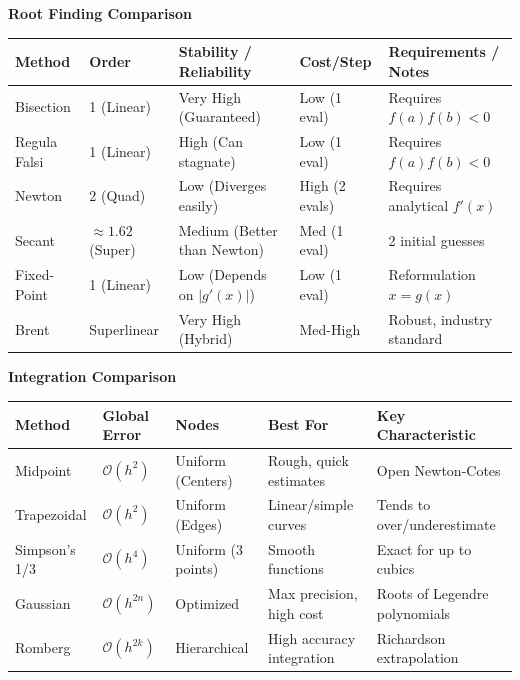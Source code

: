 \documentclass[10pt, landscape, twocolumn]{article}
\begin{document}
\renewcommand{\arraystretch}{1.1}
{\large
\centering

\textbf{\Large Root Finding Comparison}
\vspace{0.3em}

\noindent 
\begin{tabularx}{0.95\linewidth}{l l X X l}
\toprule
\textbf{Method} & \textbf{Order} & \textbf{Stability / Reliability} & \textbf{Cost/Step} & \textbf{Requirements / Notes} \\
\midrule
Bisection & 1 (Linear)   & Very High (Guaranteed) & Low (1 eval) & Requires $f(a)f(b) < 0$ \\
Regula Falsi & 1 (Linear) & High (Can stagnate) & Low (1 eval) & Requires $f(a)f(b) < 0$ \\
Newton    & 2 (Quad)     & Low (Diverges easily)  & High (2 evals) & Requires analytical $f'(x)$ \\
Secant    & $\approx 1.62$ (Super) & Medium (Better than Newton) & Med (1 eval) & 2 initial guesses \\
Fixed-Point & 1 (Linear) & Low (Depends on $|g'(x)|$) & Low (1 eval) & Reformulation $x = g(x)$ \\
Brent     & Superlinear  & Very High (Hybrid)   & Med-High & Robust, industry standard \\
\bottomrule
\end{tabularx}

\vspace{1em}
\textbf{\Large Integration Comparison}
\vspace{0.3em}

\noindent
\begin{tabularx}{0.95\linewidth}{l l X X X}
\toprule
\textbf{Method} & \textbf{Global Error} & \textbf{Nodes} & \textbf{Best For} & \textbf{Key Characteristic} \\
\midrule
Midpoint & $\mathcal{O}(h^2)$ & Uniform (Centers) & Rough, quick estimates & Open Newton-Cotes \\
Trapezoidal & $\mathcal{O}(h^2)$ & Uniform (Edges) & Linear/simple curves & Tends to over/underestimate \\
Simpson's 1/3 & $\mathcal{O}(h^4)$ & Uniform (3 points) & Smooth functions & Exact for up to cubics \\
Gaussian & $\mathcal{O}(h^{2n})$ & Optimized & Max precision, high cost & Roots of Legendre polynomials \\
Romberg & $\mathcal{O}(h^{2k})$ & Hierarchical & High accuracy integration & Richardson extrapolation \\
\bottomrule
\end{tabularx}

}
\end{document}
